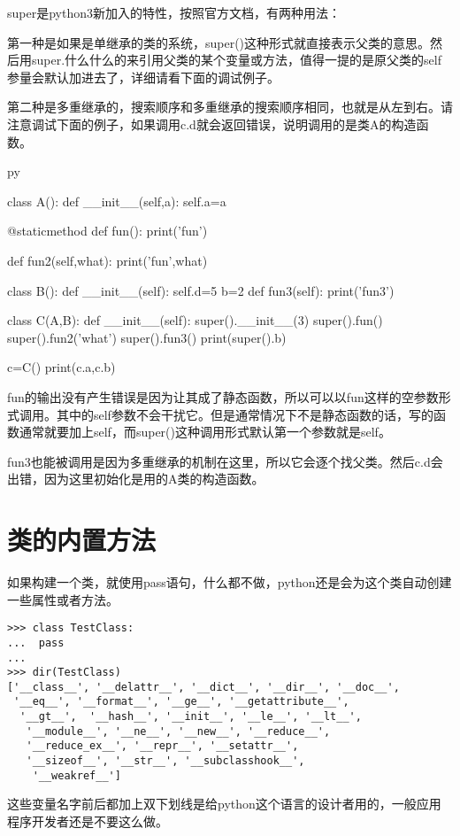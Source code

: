 \documentclass[12pt,oneside]{book}
\begin{document}
\begin{common-format}
super是python3新加入的特性，按照官方文档，有两种用法：

第一种是如果是单继承的类的系统，super()这种形式就直接表示父类的意思。然后用super.什么什么的来引用父类的某个变量或方法，值得一提的是原父类的self参量会默认加进去了，详细请看下面的调试例子。

第二种是多重继承的，搜索顺序和多重继承的搜索顺序相同，也就是从左到右。请注意调试下面的例子，如果调用c.d就会返回错误，说明调用的是类A的构造函数。

\begin{xverbatim}[129]{py}

class A():
    def __init__(self,a):
        self.a=a

    @staticmethod
    def fun():
        print('fun')

    def fun2(self,what):
        print('fun',what)

class B():
    def __init__(self):
        self.d=5
    b=2
    def fun3(self):
        print('fun3')

class C(A,B):
    def __init__(self):
        super().__init__(3)
        super().fun()
        super().fun2('what')
        super().fun3()
        print(super().b)

c=C()
print(c.a,c.b)
\end{xverbatim}
fun的输出没有产生错误是因为让其成了静态函数，所以可以以fun这样的空参数形式调用。其中的self参数不会干扰它。但是通常情况下不是静态函数的话，写的函数通常就要加上self，而super()这种调用形式默认第一个参数就是self。

fun3也能被调用是因为多重继承的机制在这里，所以它会逐个找父类。然后c.d会出错，因为这里初始化是用的A类的构造函数。


\section{类的内置方法}
如果构建一个类，就使用pass语句，什么都不做，python还是会为这个类自动创建一些属性或者方法。
\begin{Verbatim}
>>> class TestClass:
...  pass
... 
>>> dir(TestClass)
['__class__', '__delattr__', '__dict__', '__dir__', '__doc__',
 '__eq__', '__format__', '__ge__', '__getattribute__',
  '__gt__',  '__hash__', '__init__', '__le__', '__lt__',
   '__module__', '__ne__', '__new__', '__reduce__', 
   '__reduce_ex__', '__repr__', '__setattr__', 
   '__sizeof__', '__str__', '__subclasshook__',
    '__weakref__']
\end{Verbatim}

这些变量名字前后都加上双下划线是给python这个语言的设计者用的，一般应用程序开发者还是不要这么做。


\end{common-format}
\end{document}
